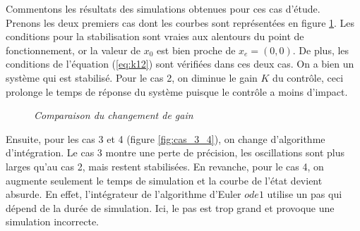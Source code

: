 \documentclass[11pt,french]{article} %
\begin{document}
\quad Commentons les résultats des simulations obtenues pour ces cas d'étude. \\

\quad Prenons les deux premiers cas dont les courbes sont représentées en figure \ref{fig:cas_1_2}. Les conditions pour la stabilisation sont vraies aux alentours du point de fonctionnement, or la valeur de $x_0$ est bien proche de $x_e=(0,0)$. De plus, les conditions de l'équation (\ref{eq:k12}) sont vérifiées dans ces deux cas. On a bien un système qui est stabilisé. Pour le cas 2, on diminue le gain $K$ du contrôle, ceci prolonge le temps de réponse du système puisque le contrôle a moins d'impact. \\

\begin{figure}[H]%
    \centering
		\noindent{}%
		\caption{\textit{Comparaison du changement de gain}}%
		\label{fig:cas_1_2}%
\end{figure}
\vspace{0.5cm}

\quad Ensuite, pour les cas 3 et 4 (figure \ref{fig:cas_3_4}), on change d'algorithme d'intégration. Le cas 3 montre une perte de précision, les oscillations sont plus larges qu'au cas 2, mais restent stabilisées. En revanche, pour le cas 4, on augmente seulement le temps de simulation et la courbe de l'état devient absurde. En effet, l'intégrateur de l'algorithme d'Euler $ode1$ utilise un pas qui dépend de la durée de simulation. Ici, le pas est trop grand et provoque une simulation incorrecte. \\
\end{document}
